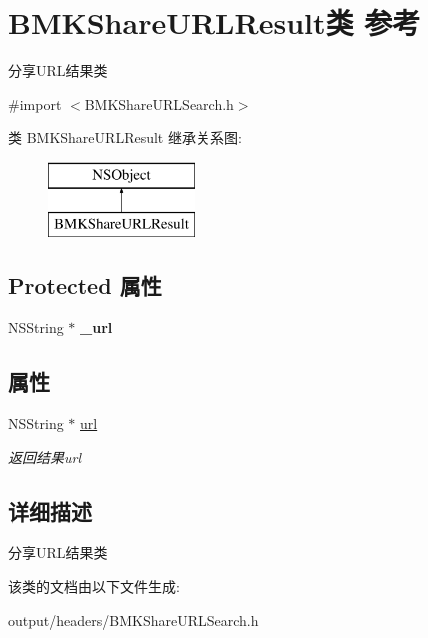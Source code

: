\hypertarget{interface_b_m_k_share_u_r_l_result}{}\section{B\+M\+K\+Share\+U\+R\+L\+Result类 参考}
\label{interface_b_m_k_share_u_r_l_result}


分享\+U\+R\+L结果类  




{\ttfamily \#import $<$B\+M\+K\+Share\+U\+R\+L\+Search.\+h$>$}

类 B\+M\+K\+Share\+U\+R\+L\+Result 继承关系图\+:\begin{figure}[H]
\begin{center}
\leavevmode
\includegraphics[height=2.000000cm]{interface_b_m_k_share_u_r_l_result}
\end{center}
\end{figure}
\subsection*{Protected 属性}
\begin{DoxyCompactItemize}
\item 
\hypertarget{interface_b_m_k_share_u_r_l_result_ae6060f2c0da5559f27d001b81b703149}{}N\+S\+String $\ast$ {\bfseries \+\_\+url}\label{interface_b_m_k_share_u_r_l_result_ae6060f2c0da5559f27d001b81b703149}

\end{DoxyCompactItemize}
\subsection*{属性}
\begin{DoxyCompactItemize}
\item 
\hypertarget{interface_b_m_k_share_u_r_l_result_aab32f03a7af14ad74e61dcc24e4c9554}{}N\+S\+String $\ast$ \hyperlink{interface_b_m_k_share_u_r_l_result_aab32f03a7af14ad74e61dcc24e4c9554}{url}\label{interface_b_m_k_share_u_r_l_result_aab32f03a7af14ad74e61dcc24e4c9554}

\begin{DoxyCompactList}\small\item\em 返回结果url \end{DoxyCompactList}\end{DoxyCompactItemize}


\subsection{详细描述}
分享\+U\+R\+L结果类 

该类的文档由以下文件生成\+:\begin{DoxyCompactItemize}
\item 
output/headers/B\+M\+K\+Share\+U\+R\+L\+Search.\+h\end{DoxyCompactItemize}
